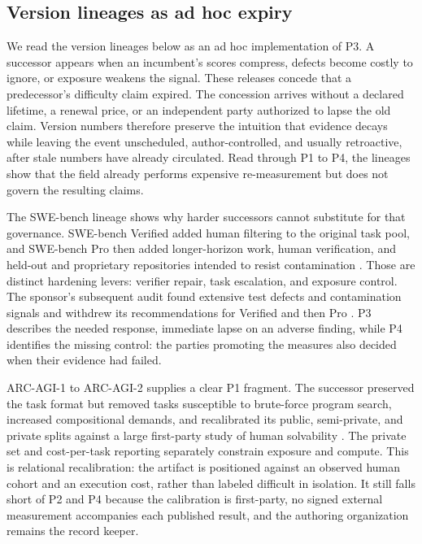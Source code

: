 \documentclass[11pt]{article}
\begin{document}
\subsection{Version lineages as ad hoc expiry}
\label{sec:version-lineages}

We read the version lineages below as an ad hoc implementation of P3. A successor appears when an incumbent's scores compress, defects become costly to ignore, or exposure weakens the signal. These releases concede that a predecessor's difficulty claim expired. The concession arrives without a declared lifetime, a renewal price, or an independent party authorized to lapse the old claim. Version numbers therefore preserve the intuition that evidence decays while leaving the event unscheduled, author-controlled, and usually retroactive, after stale numbers have already circulated. Read through P1 to P4, the lineages show that the field already performs expensive re-measurement but does not govern the resulting claims.

The SWE-bench lineage shows why harder successors cannot substitute for that governance. SWE-bench Verified added human filtering to the original task pool, and SWE-bench Pro then added longer-horizon work, human verification, and held-out and proprietary repositories intended to resist contamination \citep{jimenez2024swebench, deng2025swebenchpro}. Those are distinct hardening levers: verifier repair, task escalation, and exposure control. The sponsor's subsequent audit found extensive test defects and contamination signals and withdrew its recommendations for Verified and then Pro \citep{openai2026retraction, openai2026signal}. P3 describes the needed response, immediate lapse on an adverse finding, while P4 identifies the missing control: the parties promoting the measures also decided when their evidence had failed.

ARC-AGI-1 to ARC-AGI-2 supplies a clear P1 fragment. The successor preserved the task format but removed tasks susceptible to brute-force program search, increased compositional demands, and recalibrated its public, semi-private, and private splits against a large first-party study of human solvability \citep{chollet2025arcagi2}. The private set and cost-per-task reporting separately constrain exposure and compute. This is relational recalibration: the artifact is positioned against an observed human cohort and an execution cost, rather than labeled difficult in isolation. It still falls short of P2 and P4 because the calibration is first-party, no signed external measurement accompanies each published result, and the authoring organization remains the record keeper.
\end{document}
